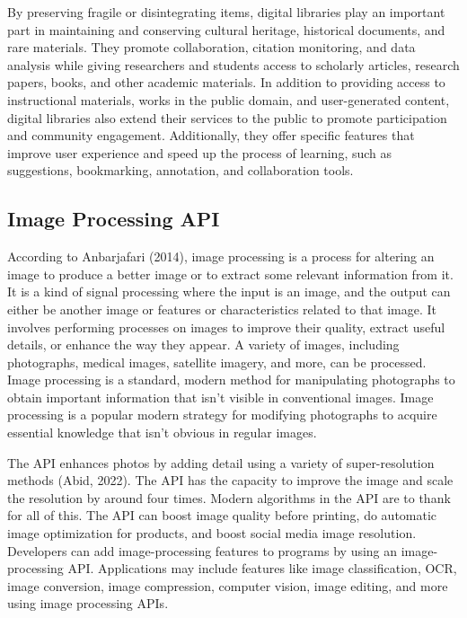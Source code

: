 \hfill

By preserving fragile or disintegrating items, digital libraries play an important part in
maintaining and conserving cultural heritage, historical documents, and rare materials. They promote
collaboration, citation monitoring, and data analysis while giving researchers and students access
to scholarly articles, research papers, books, and other academic materials. In addition to
providing access to instructional materials, works in the public domain, and user-generated content,
digital libraries also extend their services to the public to promote participation and community
engagement. Additionally, they offer specific features that improve user experience and speed up the
process of learning, such as suggestions, bookmarking, annotation, and collaboration tools.

\subsection*{Image Processing API}
\hspace\parindent
According to Anbarjafari (2014), image processing is a process for altering an image to produce a
better image or to extract some relevant information from it. It is a kind of signal processing
where the input is an image, and the output can either be another image or features or
characteristics related to that image. It involves performing processes on images to improve their
quality, extract useful details, or enhance the way they appear. A variety of images, including
photographs, medical images, satellite imagery, and more, can be processed. Image processing is a
standard, modern method for manipulating photographs to obtain important information that isn’t
visible in conventional images. Image processing is a popular modern strategy for modifying
photographs to acquire essential knowledge that isn't obvious in regular images.

\hfill

The API enhances photos by adding detail using a variety of super-resolution methods (Abid, 2022).
The API has the capacity to improve the image and scale the resolution by around four times. Modern
algorithms in the API are to thank for all of this. The API can boost image quality before printing,
do automatic image optimization for products, and boost social media image resolution. Developers
can add image-processing features to programs by using an image-processing API. Applications may
include features like image classification, OCR, image conversion, image compression, computer
vision, image editing, and more using image processing APIs.

